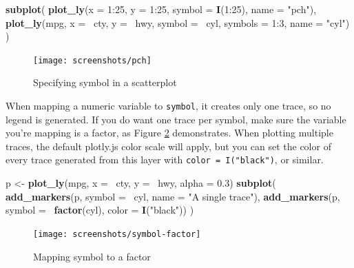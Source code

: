 \documentclass[12pt,]{isuthesis}
\newenvironment{Shaded}{\begin{snugshade}}{\end{snugshade}}
\newcommand{\KeywordTok}[1]{\textcolor[rgb]{0.13,0.29,0.53}{\textbf{{#1}}}}
\newcommand{\DataTypeTok}[1]{\textcolor[rgb]{0.13,0.29,0.53}{{#1}}}
\newcommand{\DecValTok}[1]{\textcolor[rgb]{0.00,0.00,0.81}{{#1}}}
\newcommand{\FloatTok}[1]{\textcolor[rgb]{0.00,0.00,0.81}{{#1}}}
\newcommand{\StringTok}[1]{\textcolor[rgb]{0.31,0.60,0.02}{{#1}}}
\newcommand{\NormalTok}[1]{{#1}}
\begin{document}
\begin{Shaded}
\begin{Highlighting}[]
\KeywordTok{subplot}\NormalTok{(}
  \KeywordTok{plot_ly}\NormalTok{(}\DataTypeTok{x =} \DecValTok{1}\NormalTok{:}\DecValTok{25}\NormalTok{, }\DataTypeTok{y =} \DecValTok{1}\NormalTok{:}\DecValTok{25}\NormalTok{, }\DataTypeTok{symbol =} \KeywordTok{I}\NormalTok{(}\DecValTok{1}\NormalTok{:}\DecValTok{25}\NormalTok{), }\DataTypeTok{name =} \StringTok{"pch"}\NormalTok{),}
  \KeywordTok{plot_ly}\NormalTok{(mpg, }\DataTypeTok{x =} \NormalTok{~cty, }\DataTypeTok{y =} \NormalTok{~hwy, }\DataTypeTok{symbol =} \NormalTok{~cyl, }
          \DataTypeTok{symbols =} \DecValTok{1}\NormalTok{:}\DecValTok{3}\NormalTok{, }\DataTypeTok{name =} \StringTok{"cyl"}\NormalTok{)}
\NormalTok{)}
\end{Highlighting}
\end{Shaded}

\begin{figure}
\centering
\texttt{[image: screenshots/pch]}
\caption{\label{fig:pch}Specifying symbol in a scatterplot}
\end{figure}

When mapping a numeric variable to \texttt{symbol}, it creates only one
trace, so no legend is generated. If you do want one trace per symbol,
make sure the variable you're mapping is a factor, as Figure
\ref{fig:symbol-factor} demonstrates. When plotting multiple traces, the
default plotly.js color scale will apply, but you can set the color of
every trace generated from this layer with
\texttt{color\ =\ I("black")}, or similar.

\begin{Shaded}
\begin{Highlighting}[]
\NormalTok{p <-}\StringTok{ }\KeywordTok{plot_ly}\NormalTok{(mpg, }\DataTypeTok{x =} \NormalTok{~cty, }\DataTypeTok{y =} \NormalTok{~hwy, }\DataTypeTok{alpha =} \FloatTok{0.3}\NormalTok{) }
\KeywordTok{subplot}\NormalTok{(}
  \KeywordTok{add_markers}\NormalTok{(p, }\DataTypeTok{symbol =} \NormalTok{~cyl, }\DataTypeTok{name =} \StringTok{"A single trace"}\NormalTok{),}
  \KeywordTok{add_markers}\NormalTok{(p, }\DataTypeTok{symbol =} \NormalTok{~}\KeywordTok{factor}\NormalTok{(cyl), }\DataTypeTok{color =} \KeywordTok{I}\NormalTok{(}\StringTok{"black"}\NormalTok{))}
\NormalTok{)}
\end{Highlighting}
\end{Shaded}

\begin{figure}
\centering
\texttt{[image: screenshots/symbol-factor]}
\caption{\label{fig:symbol-factor}Mapping symbol to a factor}
\end{figure}
\end{document}
